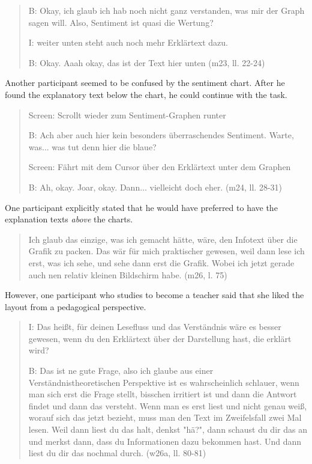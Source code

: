 \begin{quote}
    B: Okay, ich glaub ich hab noch nicht ganz verstanden, was mir der Graph sagen will. Also, Sentiment ist quasi die Wertung?

    I: weiter unten steht auch noch mehr Erklärtext dazu.

    B: Okay. Aaah okay, das ist der Text hier unten (m23, ll. 22-24)
\end{quote}

Another participant seemed to be confused by the sentiment chart. After he found the explanatory text below the chart, he could continue with the task.

\begin{quote}
    Screen: Scrollt wieder zum Sentiment-Graphen runter
    
    B: Ach aber auch hier kein besonders überraschendes Sentiment. Warte, was... was tut denn hier die blaue?

    Screen: Fährt mit dem Cursor über den Erklärtext unter dem Graphen
    
    B: Ah, okay. Joar, okay. Dann... vielleicht doch eher. (m24, ll. 28-31) 
\end{quote}

One participant explicitly stated that he would have preferred to have the explanation texts \emph{above} the charts.

\begin{quote}
    Ich glaub das einzige, was ich gemacht hätte, wäre, den Infotext über die Grafik zu packen. Das wär für mich praktischer gewesen, weil dann lese ich erst, was ich sehe, und sehe dann erst die Grafik. Wobei ich jetzt gerade auch nen relativ kleinen Bildschirm habe. (m26, l. 75)
\end{quote}

However, one participant who studies to become a teacher said that she liked the layout from a pedagogical perspective.

\begin{quote}
    I: Das heißt, für deinen Lesefluss und das Verständnis wäre es besser gewesen, wenn du den Erklärtext über der Darstellung hast, die erklärt wird?

    B: Das ist ne gute Frage, also ich glaube aus einer Verständnistheoretischen Perspektive ist es wahrscheinlich schlauer, wenn man sich erst die Frage stellt, bisschen irritiert ist und dann die Antwort findet und dann das versteht. Wenn man es erst liest und nicht genau weiß, worauf sich das jetzt bezieht, muss man den Text im Zweifelsfall zwei Mal lesen. Weil dann liest du das halt, denkst "hä?", dann schaust du dir das an und merkst dann, dass du Informationen dazu bekommen hast. Und dann liest du dir das nochmal durch. (w26a, ll. 80-81)
\end{quote}

